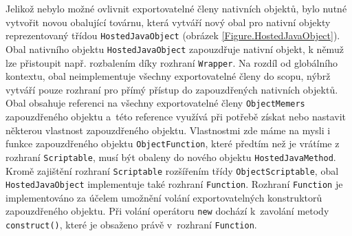 Jelikož nebylo možné ovlivnit exportovatelné členy nativních objektů, bylo nutné vytvořit novou obalující továrnu, která vytváří nový obal pro nativní objekty reprezentovaný třídou \texttt{HostedJavaObject} (obrázek \ref{Figure.HostedJavaObject}). Obal nativního objektu \texttt{HostedJavaObject} zapouzdřuje nativní objekt, k němuž lze přistoupit např. rozbalením díky rozhraní \texttt{Wrapper}. Na rozdíl od globálního kontextu, obal neimplementuje všechny exportovatelné členy do scopu, nýbrž vytváří pouze rozhraní pro přímý přístup do zapouzdřených nativních objektů. Obal obsahuje referenci na všechny exportovatelné členy \texttt{ObjectMemers} zapouzdřeného objektu a~této reference využívá při potřebě získat nebo nastavit některou vlastnost zapouzdřeného objektu. Vlastnostmi zde máme na mysli i funkce zapouzdřeného objektu \texttt{ObjectFunction}, které předtím než je vrátíme z rozhraní \texttt{Scriptable}, musí být obaleny do nového objektu \texttt{HostedJavaMethod}. Kromě zajištění rozhraní \texttt{Scriptable} rozšířením třídy \texttt{ObjectScriptable}, obal \texttt{HostedJavaObject} implementuje také rozhraní \texttt{Function}. Rozhraní \texttt{Function} je implementováno za účelem umožnění volání exportovatelných konstruktorů zapouzdřeného objektu. Při volání operátoru \texttt{new} dochází k~zavolání metody \texttt{construct()}, které je obsaženo právě v~rozhraní \texttt{Function}.

